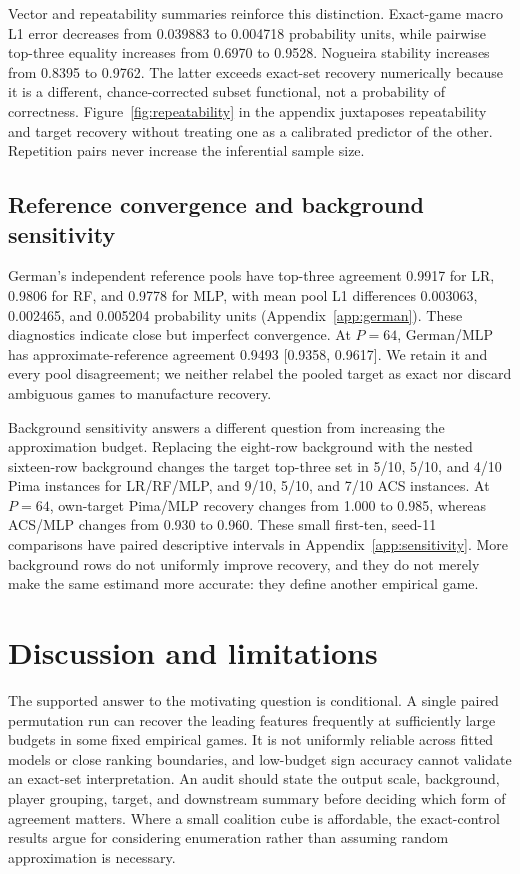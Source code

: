 \documentclass{article}
\begin{document}
Vector and repeatability summaries reinforce this distinction. Exact-game macro L1 error decreases from 0.039883 to 0.004718 probability units, while pairwise top-three equality increases from 0.6970 to 0.9528. Nogueira stability increases from 0.8395 to 0.9762. The latter exceeds exact-set recovery numerically because it is a different, chance-corrected subset functional, not a probability of correctness. Figure~\ref{fig:repeatability} in the appendix juxtaposes repeatability and target recovery without treating one as a calibrated predictor of the other. Repetition pairs never increase the inferential sample size.

\subsection{Reference convergence and background sensitivity}
German's independent reference pools have top-three agreement 0.9917 for LR, 0.9806 for RF, and 0.9778 for MLP, with mean pool L1 differences 0.003063, 0.002465, and 0.005204 probability units (Appendix~\ref{app:german}). These diagnostics indicate close but imperfect convergence. At $P=64$, German/MLP has approximate-reference agreement 0.9493 [0.9358, 0.9617]. We retain it and every pool disagreement; we neither relabel the pooled target as exact nor discard ambiguous games to manufacture recovery.

Background sensitivity answers a different question from increasing the approximation budget. Replacing the eight-row background with the nested sixteen-row background changes the target top-three set in 5/10, 5/10, and 4/10 Pima instances for LR/RF/MLP, and 9/10, 5/10, and 7/10 ACS instances. At $P=64$, own-target Pima/MLP recovery changes from 1.000 to 0.985, whereas ACS/MLP changes from 0.930 to 0.960. These small first-ten, seed-11 comparisons have paired descriptive intervals in Appendix~\ref{app:sensitivity}. More background rows do not uniformly improve recovery, and they do not merely make the same estimand more accurate: they define another empirical game.

\section{Discussion and limitations}
\label{sec:discussion}
The supported answer to the motivating question is conditional. A single paired permutation run can recover the leading features frequently at sufficiently large budgets in some fixed empirical games. It is not uniformly reliable across fitted models or close ranking boundaries, and low-budget sign accuracy cannot validate an exact-set interpretation. An audit should state the output scale, background, player grouping, target, and downstream summary before deciding which form of agreement matters. Where a small coalition cube is affordable, the exact-control results argue for considering enumeration rather than assuming random approximation is necessary.
\end{document}
